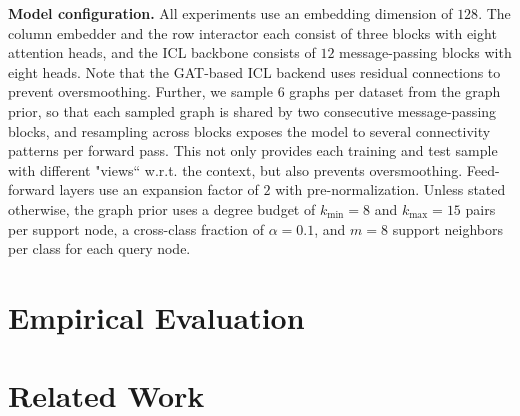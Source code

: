 \documentclass{article} %
\begin{document}
\textbf{Model configuration.} All experiments use an embedding dimension of $128$. The column embedder and the row interactor each consist of three blocks with eight attention heads, and the ICL backbone consists of $12$ message-passing blocks with eight heads. Note that the GAT-based ICL backend uses residual connections to prevent oversmoothing. Further, we sample $6$ graphs per dataset from the graph prior, so that each sampled graph is shared by two consecutive message-passing blocks, and resampling across blocks exposes the model to several connectivity patterns per forward pass. This not only provides each training and test sample with different "views`` w.r.t. the context, but also prevents oversmoothing. Feed-forward layers use an expansion factor of $2$ with pre-normalization. Unless stated otherwise, the graph prior uses a degree budget of $k_{\text{min}} = 8$ and $k_{\text{max}} = 15$ pairs per support node, a cross-class fraction of $\alpha = 0.1$, and $m = 8$ support neighbors per class for each query node.


\section{Empirical Evaluation}

\section{Related Work}
\end{document}
